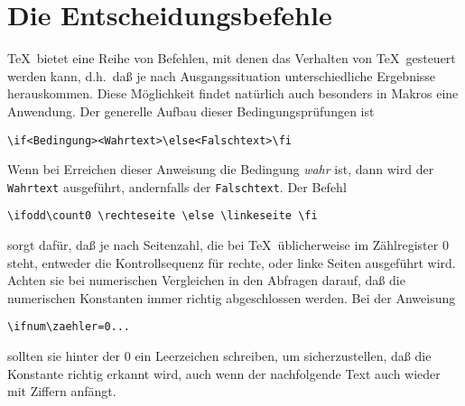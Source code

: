 \section{Die Entscheidungsbefehle}
\TeX\ bietet eine Reihe von Befehlen, mit denen das Verhalten von
\TeX\ gesteuert werden kann, d.h.\ da\ss{} je nach Ausgangssituation
unterschiedliche Ergebnisse herauskommen. Diese M\"oglichkeit findet
nat\"urlich auch besonders in Makros eine Anwendung. Der generelle
Aufbau dieser Bedingungspr\"ufungen ist
\begin{verbatim}
\if<Bedingung><Wahrtext>\else<Falschtext>\fi
\end{verbatim}
Wenn bei Erreichen dieser Anweisung die Bedingung {\em wahr} ist, dann
wird der {\tt Wahrtext} ausgef\"uhrt, andernfalls der {\tt Falschtext}.
Der Befehl
\begin{verbatim}
\ifodd\count0 \rechteseite \else \linkeseite \fi
\end{verbatim}
sorgt daf\"ur, da\ss{} je nach 
Seitenzahl, die bei \TeX\ \"ublicherweise im
Z\"ahlregister $0$ steht, entweder die 
Kontrollsequenz f\"ur rechte, oder
linke Seiten ausgef\"uhrt wird. Achten sie bei numerischen Vergleichen
in den Abfragen darauf, da\ss{} die numerischen Konstanten immer richtig
abgeschlossen werden. Bei der Anweisung
\begin{verbatim}
\ifnum\zaehler=0...
\end{verbatim}
sollten sie hinter der $0$ ein Leerzeichen schreiben, um
sicherzustellen, da\ss{} die Konstante richtig erkannt wird, auch wenn der
nachfolgende Text auch wieder mit Ziffern anf\"angt.


